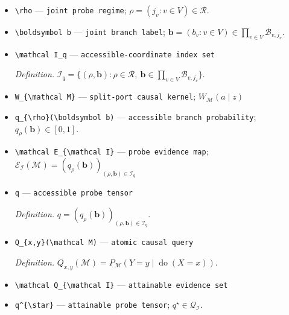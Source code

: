 \documentclass{article}
\begin{document}
\begin{itemize}
  \par\smallskip\noindent\emph{Definition.} \(\mathcal R=\prod_{v\in V}\mathcal J_v\).
  \item \texttt{\textbackslash{}\allowbreak{}rho} --- \texttt{joint probe regime}; \(\rho=(j_v:v\in V)\in\mathcal R\).
  \item \texttt{\textbackslash{}\allowbreak{}boldsymbol b} --- \texttt{joint branch label}; \(\boldsymbol b=(b_v:v\in V)\in\prod_{v\in V}\mathcal B_{v,j_v}\).
  \item \texttt{\textbackslash{}\allowbreak{}mathcal I\_\allowbreak{}q} --- \texttt{accessible-\allowbreak{}coordinate index set}
  \par\smallskip\noindent\emph{Definition.} \(\mathcal I_q=\{(\rho,\boldsymbol b):\rho\in\mathcal R,\ \boldsymbol b\in\prod_{v\in V}\mathcal B_{v,j_v}\}\).
  \item \texttt{W\_\allowbreak{}\{\textbackslash{}\allowbreak{}mathcal M\}\allowbreak{}} --- \texttt{split-\allowbreak{}port causal kernel}; \(W_{\mathcal M}(a\mid z)\)
  \item \texttt{q\_\allowbreak{}\{\textbackslash{}\allowbreak{}rho\}\allowbreak{}(\textbackslash{}\allowbreak{}boldsymbol b)} --- \texttt{accessible branch probability}; \(q_{\rho}(\boldsymbol b)\in[0,1]\).
  \item \texttt{\textbackslash{}\allowbreak{}mathcal E\_\allowbreak{}\{\textbackslash{}\allowbreak{}mathcal I\}\allowbreak{}} --- \texttt{probe evidence map}; \(\mathcal E_{\mathcal I}(\mathcal M)=(q_{\rho}(\boldsymbol b))_{(\rho,\boldsymbol b)\in\mathcal I_q}\)
  \item \texttt{q} --- \texttt{accessible probe tensor}
  \par\smallskip\noindent\emph{Definition.} \(q=(q_{\rho}(\boldsymbol b))_{(\rho,\boldsymbol b)\in\mathcal I_q}\).
  \item \texttt{Q\_\allowbreak{}\{x,\allowbreak{}y\}\allowbreak{}(\textbackslash{}\allowbreak{}mathcal M)} --- \texttt{atomic causal query}
  \par\smallskip\noindent\emph{Definition.} \(Q_{x,y}(\mathcal M)=P_{\mathcal M}(Y=y\mid\operatorname{do}(X=x))\).
  \item \texttt{\textbackslash{}\allowbreak{}mathcal Q\_\allowbreak{}\{\textbackslash{}\allowbreak{}mathcal I\}\allowbreak{}} --- \texttt{attainable evidence set}
  \item \texttt{q\textasciicircum{}\{\textbackslash{}\allowbreak{}star\}\allowbreak{}} --- \texttt{attainable probe tensor}; \(q^{\star}\in\mathcal Q_{\mathcal I}\).

\end{itemize}
\end{document}
